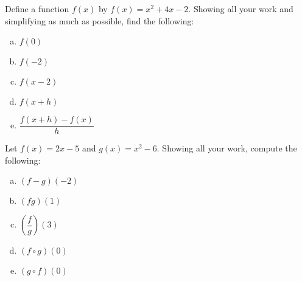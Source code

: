\documentclass[11pt,letterpaper]{article}
\begin{document}

 Define a function $f(x)$ by $f(x)= x^2 + 4x - 2$. Showing all your work and simplifying as much as possible, find the following:
	\begin{enumerate}[(a)]
	\item $f(0)$
	\item $f(-2)$
	\item $f(x - 2)$
	\item $f(x + h)$
	\item $\dfrac{f(x + h) - f(x)}{h}$
	\end{enumerate}



\newpage



 Let $f(x)= 2x - 5$ and $g(x)= x^2 - 6$. Showing all your work, compute the following:
	\begin{enumerate}[(a)]
	\item $(f - g)(-2)$
	\item $(fg)(1)$
	\item $\left( \dfrac{f}{g} \right)(3)$
	\item $(f \circ g)(0)$
	\item $(g \circ f)(0)$
	\end{enumerate}
\end{document}
